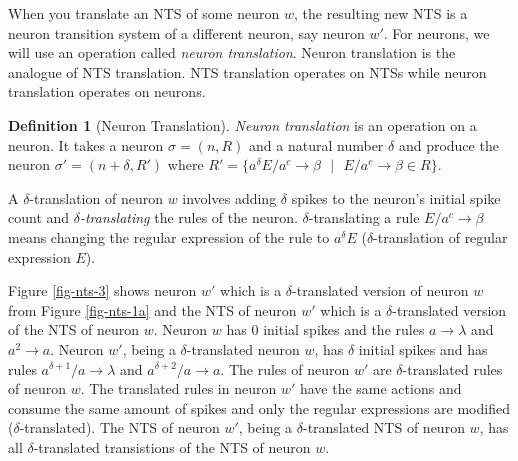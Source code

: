 \documentclass[]{elsarticle}
\theoremstyle{definition}
\newtheorem{definition2}{Definition}
\theoremstyle{definition}
\newcommand{\ra}{\rightarrow}
\newcommand{\se}{\text{ }}
\begin{document}

When you translate an NTS of some neuron $w$, the resulting new NTS is a neuron transition system 
of a different neuron, say neuron $w'$. For neurons, we will use an operation called \emph{neuron
translation}. Neuron translation is the analogue of NTS translation. NTS translation operates on
NTSs while neuron translation operates on neurons.


\begin{definition2}[Neuron Translation]
\emph{Neuron translation} is an operation on a neuron. It takes a neuron $\sigma=(n,R)$ and a
natural number $\delta$ and produce the neuron $\sigma'=(n+\delta, R')$ where 
$R'=\{a^{\delta}E/a^c \ra \beta\se|\se E/a^c\ra \beta \in R\}$.
\end{definition2}


A $\delta$-translation of neuron $w$ involves adding $\delta$ spikes to the neuron's initial spike
count and \emph{$\delta$-translating} the rules of the neuron. $\delta$-translating a rule 
$E/a^c\ra \beta$ means changing the regular expression of the rule to $a^{\delta}E$ 
($\delta$-translation of regular expression $E$). 

Figure \ref{fig-nts-3} shows neuron $w'$ which is a $\delta$-translated version of neuron $w$
from Figure \ref{fig-nts-1a} and the NTS of neuron $w'$ which is a $\delta$-translated version of
the NTS of neuron $w$. Neuron $w$ has $0$ initial spikes and the rules $a\ra\lambda$ and $a^2\ra a$. 
Neuron $w'$, being a $\delta$-translated neuron $w$, has $\delta$ initial spikes and has rules
$a^{\delta+1}/a\ra\lambda$ and $a^{\delta+2}/a\ra a$. The rules of neuron $w'$ are 
$\delta$-translated rules of neuron $w$. The translated rules in neuron $w'$ have the same actions
and consume the same amount of spikes and only the regular expressions are modified 
($\delta$-translated). The NTS of neuron $w'$, being a $\delta$-translated NTS of neuron $w$, has
all $\delta$-translated transistions of the NTS of neuron $w$. 

\end{document}
